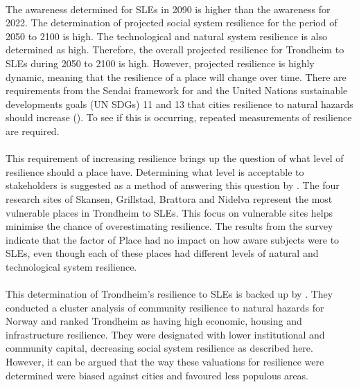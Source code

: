 \paragraph{}
The awareness determined for SLEs in 2090 is higher than the awareness for 2022. The determination of projected social system resilience for the period of 2050 to 2100 is high. The technological and natural system resilience is also determined as high. Therefore, the overall projected resilience for Trondheim to SLEs during 2050 to 2100 is high. However, projected resilience is highly dynamic, meaning that the resilience of a place will change over time. There are requirements from the Sendai framework for and the United Nations sustainable developments goals (UN SDGs) 11 and 13 that cities resilience to natural hazards should increase (\cite{gonzalez-riancho_storm_2017}). To see if this is occurring, repeated measurements of resilience are required. 

\paragraph{}
This requirement of increasing resilience brings up the question of what level of resilience should a place have. Determining what level is acceptable to stakeholders is suggested as a method of answering this question by \cite{gerkensmeier_governing_2018}. The four research sites of Skansen, Grillstad, Brattora and Nidelva represent the most vulnerable places in Trondheim to SLEs. This focus on vulnerable sites helps minimise the chance of overestimating resilience. The results from the survey indicate that the factor of Place had no impact on how aware subjects were to SLEs, even though each of these places had different levels of natural and technological system resilience. 
\paragraph{}
This determination of Trondheim's resilience to SLEs is backed up by \cite{opach_seeking_2020}. They conducted a cluster analysis of community resilience to natural hazards for Norway and ranked Trondheim as having high economic, housing and infrastructure resilience. They were designated with lower institutional and community capital, decreasing social system resilience as described here. However, it can be argued that the way these valuations for resilience were determined were biased against cities and favoured less populous areas.



